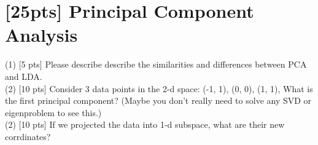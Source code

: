 \documentclass{article}
\begin{document}
	\newpage
	
	
\section{[25pts] Principal Component Analysis }
	(1) [5 pts] Please describe describe the similarities and differences between PCA and LDA.\\
	(2) [10 pts] Consider 3 data points in the 2-d space: (-1, 1), (0, 0), (1, 1), What is the first principal component? (Maybe you don't really need to solve any SVD or eigenproblem to see this.)\\
	(2) [10 pts] If we projected the data into 1-d subspace, what are their new corrdinates?
\end{document}

